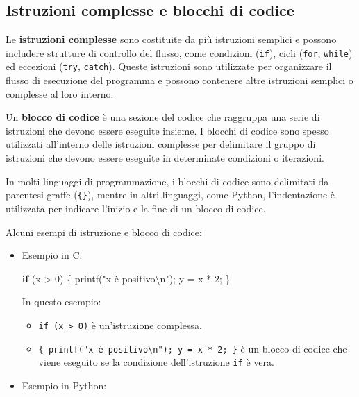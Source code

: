 \documentclass[
  letterpaper,
  DIV=11,
  numbers=noendperiod]{scrreprt}
\newenvironment{Shaded}{\begin{snugshade}}{\end{snugshade}}
\newcommand{\ControlFlowTok}[1]{\textcolor[rgb]{0.00,0.23,0.31}{\textbf{#1}}}
\newcommand{\DecValTok}[1]{\textcolor[rgb]{0.68,0.00,0.00}{#1}}
\newcommand{\NormalTok}[1]{\textcolor[rgb]{0.00,0.23,0.31}{#1}}
\newcommand{\OperatorTok}[1]{\textcolor[rgb]{0.37,0.37,0.37}{#1}}
\newcommand{\SpecialCharTok}[1]{\textcolor[rgb]{0.37,0.37,0.37}{#1}}
\newcommand{\StringTok}[1]{\textcolor[rgb]{0.13,0.47,0.30}{#1}}
\providecommand{\tightlist}{%
  \setlength{\itemsep}{0pt}\setlength{\parskip}{0pt}}\usepackage{longtable,booktabs,array}
\begin{document}
\subsection{Istruzioni complesse e blocchi di
codice}\label{istruzioni-complesse-e-blocchi-di-codice}

Le \textbf{istruzioni complesse} sono costituite da più istruzioni
semplici e possono includere strutture di controllo del flusso, come
condizioni (\texttt{if}), cicli (\texttt{for}, \texttt{while}) ed
eccezioni (\texttt{try}, \texttt{catch}). Queste istruzioni sono
utilizzate per organizzare il flusso di esecuzione del programma e
possono contenere altre istruzioni semplici o complesse al loro interno.

Un \textbf{blocco di codice} è una sezione del codice che raggruppa una
serie di istruzioni che devono essere eseguite insieme. I blocchi di
codice sono spesso utilizzati all'interno delle istruzioni complesse per
delimitare il gruppo di istruzioni che devono essere eseguite in
determinate condizioni o iterazioni.

In molti linguaggi di programmazione, i blocchi di codice sono
delimitati da parentesi graffe (\texttt{\{\}}), mentre in altri
linguaggi, come Python, l'indentazione è utilizzata per indicare
l'inizio e la fine di un blocco di codice.

Alcuni esempi di istruzione e blocco di codice:

\begin{itemize}
\item
  Esempio in C:

\begin{Shaded}
\begin{Highlighting}[]
\ControlFlowTok{if} \OperatorTok{(}\NormalTok{x }\OperatorTok{\textgreater{}} \DecValTok{0}\OperatorTok{)} \OperatorTok{\{}
\NormalTok{    printf}\OperatorTok{(}\StringTok{"x è positivo}\SpecialCharTok{\textbackslash{}n}\StringTok{"}\OperatorTok{);}
\NormalTok{    y }\OperatorTok{=}\NormalTok{ x }\OperatorTok{*} \DecValTok{2}\OperatorTok{;}
\OperatorTok{\}}
\end{Highlighting}
\end{Shaded}

  In questo esempio:

  \begin{itemize}
  \tightlist
  \item
    \texttt{if\ (x\ \textgreater{}\ 0)} è un'istruzione complessa.
  \item
    \texttt{\{\ printf("x\ è\ positivo\textbackslash{}n");\ y\ =\ x\ *\ 2;\ \}}
    è un blocco di codice che viene eseguito se la condizione
    dell'istruzione \texttt{if} è vera.
  \end{itemize}
\item
  Esempio in Python:
\end{itemize}
\end{document}
